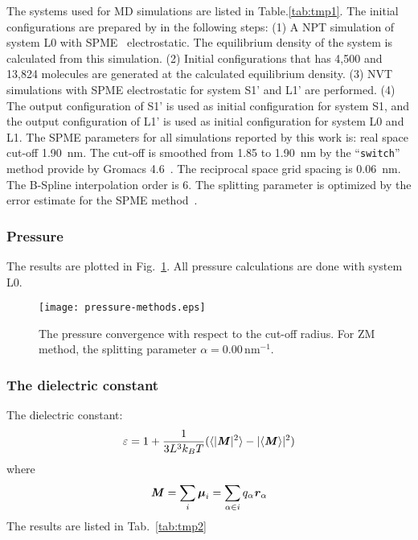 \documentclass[a4paper,reprint,unsortedaddress,onecolumn]{revtex4-1}
\newcommand{\eps}{\varepsilon}
\newcommand{\vect}[1]{\textbf{\textit{#1}}}
\begin{document}
The systems used for MD simulations are listed in
Table.\ref{tab:tmp1}.  The initial configurations are prepared by in
the following steps: (1) A NPT simulation of system L0 with SPME~\cite{darden1993pme, essmann1995spm}
electrostatic. The equilibrium density of the system is calculated
from this simulation. (2) Initial configurations that has 4,500 and
13,824 molecules are generated at the calculated equilibrium
density. (3) NVT simulations with SPME electrostatic for system S1'
and L1' are performed. (4) The output configuration of S1' is used as
initial configuration for system S1, and the output configuration of
L1' is used as initial configuration for system L0 and L1.  The SPME
parameters for all simulations reported by this work is: real space
cut-off 1.90~nm. The cut-off is smoothed from 1.85 to 1.90~nm by the
``\texttt{switch}'' method provide by Gromacs
4.6~\cite{hess2008gromacs, pronk2013gromacs}. The reciprocal space
grid spacing is 0.06~nm. The B-Spline interpolation order is 6. The
splitting parameter is optimized by the error estimate for the SPME method~\cite{wang2010optimizing}.

\subsubsection{Pressure}
The results are plotted in Fig.~\ref{fig:tmp0}. All pressure calculations are done with system L0.
\begin{figure}
  \centering
  \texttt{[image: pressure-methods.eps]}
  \caption{The pressure convergence with respect to the cut-off radius.
    For ZM method, the splitting parameter $\alpha = 0.00\,\textrm{nm}^{-1}$.
  }
  \label{fig:tmp0}
\end{figure}


\subsubsection{The dielectric constant}

The dielectric constant:
\begin{align}
  \eps = 1 + \frac{1}{3L^3 k_BT} ( \langle \vert \vect M\vert^2\rangle - \vert\langle \vect M\rangle\vert^2 )
\end{align}
where
\begin{align}
  \vect M = \sum_i\boldsymbol\mu_i = \sum_{\alpha\in i} q_\alpha\vect r_\alpha
\end{align}
The results are listed in Tab.~\ref{tab:tmp2}
\end{document}
